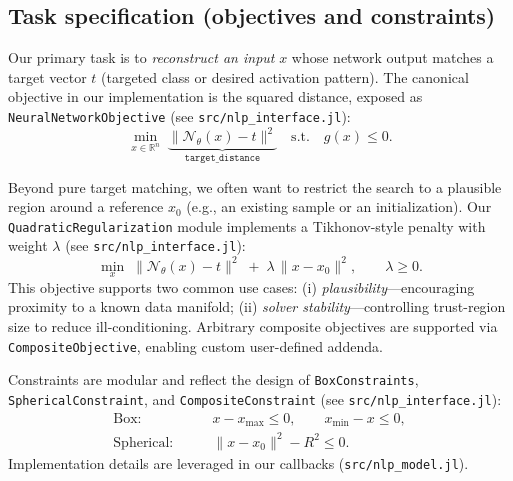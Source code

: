 \documentclass[11pt]{article}
\begin{document}
\subsection{Task specification (objectives and constraints)}
Our primary task is to \emph{reconstruct an input} $x$ whose network output matches a target vector $t$ (targeted class or desired activation pattern). The canonical objective in our implementation is the squared distance, exposed as \texttt{NeuralNetworkObjective} (see \texttt{src/nlp\_interface.jl}):
\begin{equation}
  \min_{x \in \mathbb{R}^n} \; \underbrace{\big\lVert \mathcal{N}_\theta(x) - t \big\rVert^2}_{\texttt{target\_distance}} \quad \text{s.t.} \quad g(x) \le 0.
\end{equation}

Beyond pure target matching, we often want to restrict the search to a plausible region around a reference $x_0$ (e.g., an existing sample or an initialization). Our \texttt{QuadraticRegularization} module implements a Tikhonov-style penalty with weight $\lambda$ (see \texttt{src/nlp\_interface.jl}):
\begin{equation}
  \min_{x} \; \big\lVert \mathcal{N}_\theta(x) - t \big\rVert^2 \; + \; \lambda\, \lVert x - x_0 \rVert^2, \qquad \lambda \ge 0.
\end{equation}
This objective supports two common use cases: (i) \emph{plausibility}---encouraging proximity to a known data manifold; (ii) \emph{solver stability}---controlling trust-region size to reduce ill-conditioning. Arbitrary composite objectives are supported via \texttt{CompositeObjective}, enabling custom user-defined addenda.

Constraints are modular and reflect the design of \texttt{BoxConstraints}, \texttt{SphericalConstraint}, and \texttt{CompositeConstraint} (see \texttt{src/nlp\_interface.jl}):
\begin{align}
  \text{Box:}\qquad &x - x_{\max} \le 0,\qquad x_{\min} - x \le 0, \\
  \text{Spherical:}\qquad &\lVert x - x_0 \rVert^2 - R^2 \le 0.
\end{align}
Implementation details are leveraged in our callbacks (\texttt{src/nlp\_model.jl}).
\end{document}
